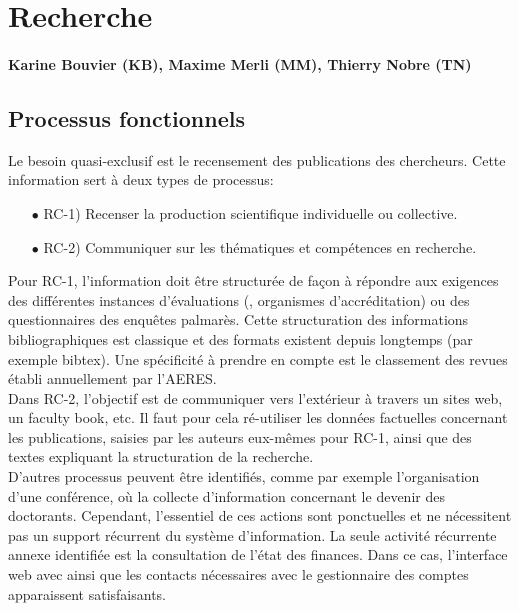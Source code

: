 \documentclass{book}
\begin{document}
\section{Recherche}
\paragraph{Karine Bouvier (KB), Maxime Merli (MM), Thierry Nobre (TN)}

\subsection{Processus fonctionnels}

Le besoin quasi-exclusif est le recensement des publications des chercheurs.
Cette information sert à deux types de processus:
\begin{itemize}
\item[$\bullet$] RC-1) Recenser la production scientifique individuelle ou 
		     collective.
\item[$\bullet$] RC-2) Communiquer sur les thématiques et compétences 
		     en recherche.
\end{itemize}

\bigskip
Pour RC-1, l'information doit être structurée de façon à répondre aux 
exigences des différentes instances d'évaluations (, organismes 
d'accréditation) ou des questionnaires des enquêtes palmarès.
Cette structuration des informations bibliographiques est classique et des
formats existent depuis longtemps (par exemple bibtex). Une spécificité
à prendre en compte est le classement des revues établi annuellement par 
l'AERES.\\

Dans  RC-2, l'objectif est de communiquer vers l'extérieur à travers un 
sites web, un faculty book, etc. Il faut pour cela ré-utiliser les données
factuelles concernant les publications, saisies par les auteurs eux-mêmes
pour RC-1, ainsi que des textes expliquant la structuration de la recherche.\\

D'autres processus peuvent être identifiés, comme par exemple l'organisation
d'une conférence, où la collecte d'information concernant le devenir des
doctorants. Cependant, l'essentiel de ces actions sont ponctuelles et ne 
nécessitent pas un support récurrent du système d'information. La seule 
activité récurrente annexe identifiée est la consultation de l'état des 
finances. Dans ce cas, l'interface web avec  ainsi que les 
contacts nécessaires avec le gestionnaire des comptes apparaissent satisfaisants.
\end{document}
